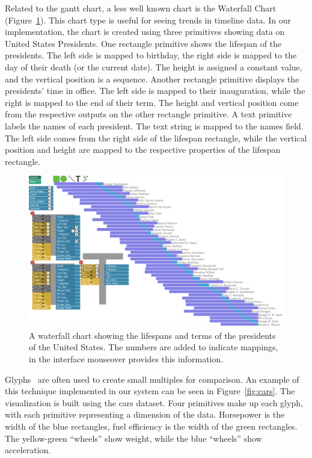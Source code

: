 Related to the gantt chart, a less well known chart is the Waterfall Chart (Figure~\ref{fig:presidents}).
This chart type is useful for seeing trends in timeline data.
In our implementation, the chart is created using three primitives showing data on United States Presidents.
One rectangle primitive shows the lifespan of the presidents.
The left side is mapped to birthday, the right side is mapped to the day of their death (or the current date).
The height is assigned a constant value, and the vertical position is a sequence.
Another rectangle primitive displays the presidents' time in office.
The left side is mapped to their inauguration, while the right is mapped to the end of their term.
The height and vertical position come from the respective outputs on the other rectangle primitive.
A text primitive labels the names of each president.
The text string is mapped to the names field.
The left side comes from the right side of the lifespan rectangle, while the vertical position and height are mapped to the respective properties of the lifespan rectangle.
\begin{figure}[t]
   \centering
   \includegraphics[width=\textwidth]{images/presidents}
   \caption{
   A waterfall chart showing the lifespans and terms of the presidents of the United States.
   The numbers are added to indicate mappings, in the interface mouseover provides this information.
}
   \label{fig:presidents}
\end{figure}

\label{glyphs}

Glyphs~\cite{Horn1998} are often used to create small multiples for comparison.
An example of this technique implemented in our system can be seen in Figure~\ref{fig:cars}.
The visualization is built using the cars dataset.
Four primitives make up each glyph, with each primitive representing a dimension of the data.
Horsepower is the width of the blue rectangles, fuel efficiency is the width of the green rectangles.
The yellow-green ``wheels'' show weight, while the blue ``wheels'' show acceleration.


